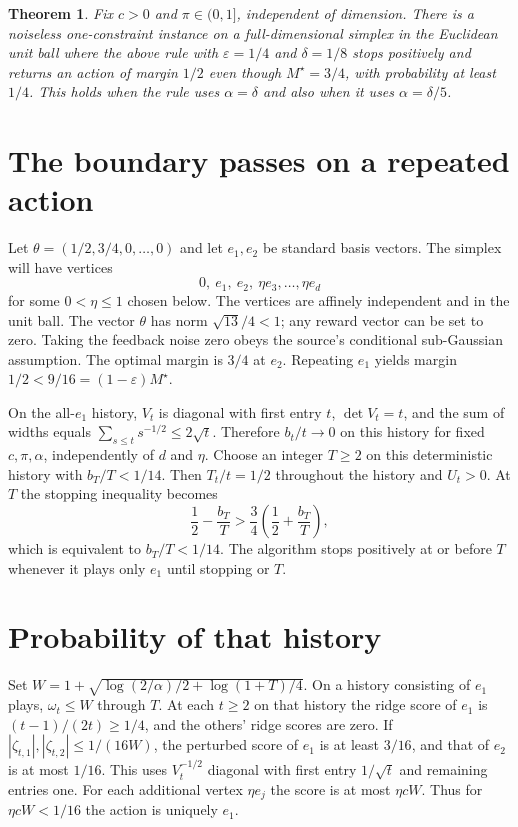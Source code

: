\documentclass[11pt]{amsart}
\newtheorem{theorem}{Theorem}
\begin{document}
\begin{theorem}
Fix \(c>0\) and \(\pi\in(0,1]\), independent of dimension. There is a noiseless one-constraint instance on a full-dimensional simplex in the Euclidean unit ball where the above rule with \(\varepsilon=1/4\) and \(\delta=1/8\) stops positively and returns an action of margin \(1/2\) even though \(M^\star=3/4\), with probability at least \(1/4\). This holds when the rule uses \(\alpha=\delta\) and also when it uses \(\alpha=\delta/5\).
\end{theorem}

\section{The boundary passes on a repeated action}
Let \(\theta=(1/2,3/4,0,\ldots,0)\) and let \(e_1,e_2\) be standard basis vectors. The simplex will have vertices
\[
                 0,\ e_1,\ e_2,\ \eta e_3,\ldots,\eta e_d
\]
for some \(0<\eta\le 1\) chosen below. The vertices are affinely independent and in the unit ball. The vector \(\theta\) has norm \(\sqrt{13}/4<1\); any reward vector can be set to zero. Taking the feedback noise zero obeys the source's conditional sub-Gaussian assumption. The optimal margin is \(3/4\) at \(e_2\). Repeating \(e_1\) yields margin \(1/2<9/16=(1-\varepsilon)M^\star\).

On the all-\(e_1\) history, \(V_t\) is diagonal with first entry \(t\), \(\det V_t=t\), and the sum of widths equals \(\sum_{s\le t}s^{-1/2}\le2\sqrt t\). Therefore \(b_t/t\to0\) on this history for fixed \(c,\pi,\alpha\), independently of \(d\) and \(\eta\). Choose an integer \(T\ge2\) on this deterministic history with \(b_T/T<1/14\). Then \(T_t/t=1/2\) throughout the history and \(U_t>0\). At \(T\) the stopping inequality becomes
\[
                \frac12-\frac{b_T}{T}>
                \frac34\left(\frac12+\frac{b_T}{T}\right),
\]
which is equivalent to \(b_T/T<1/14\). The algorithm stops positively at or before \(T\) whenever it plays only \(e_1\) until stopping or \(T\).

\section{Probability of that history}
Set \(W=1+\sqrt{\log(2/\alpha)/2+\log(1+T)/4}\). On a history consisting of \(e_1\) plays, \(\omega_t\le W\) through \(T\). At each \(t\ge2\) on that history the ridge score of \(e_1\) is \((t-1)/(2t)\ge1/4\), and the others' ridge scores are zero. If \(|\zeta_{t,1}|,|\zeta_{t,2}|\le1/(16W)\), the perturbed score of \(e_1\) is at least \(3/16\), and that of \(e_2\) is at most \(1/16\). This uses \(V_t^{-1/2}\) diagonal with first entry \(1/\sqrt t\) and remaining entries one. For each additional vertex \(\eta e_j\) the score is at most \(\eta c W\). Thus for \(\eta cW<1/16\) the action is uniquely \(e_1\).
\end{document}
